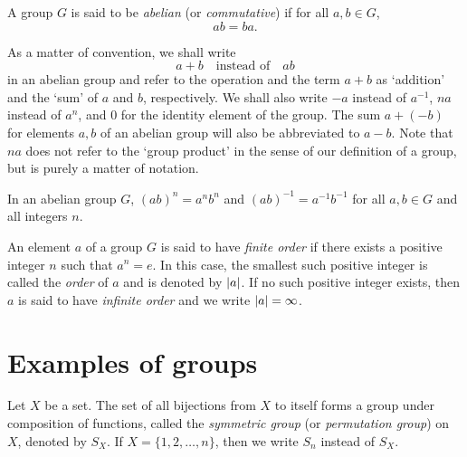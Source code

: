 \begin{definition}
    A group \(G\) is said to be \emph{abelian} (or \emph{commutative}) if for
    all \(a, b \in G\),
    \[
        ab = ba.
    \]
\end{definition}

\begin{remark}
    As a matter of convention, we shall write
    \[
        a + b \quad \text{instead of} \quad ab
    \]
    in an abelian group and refer to the operation and the term \(a + b\) as
    `addition' and the `sum' of \(a\) and \(b\), respectively. We shall also
    write \(-a\) instead of \(a^{-1}\), \(na\) instead of \(a^n\), and \(0\) for
    the identity element of the group. The sum \(a + (-b)\) for elements \(a,
    b\) of an abelian group will also be abbreviated to \(a - b\). Note that
    \(na\) does not refer to the `group product' in the sense of our definition
    of a group, but is purely a matter of notation.
\end{remark}

\begin{theorem}
    In an abelian group \(G\), \((ab)^n = a^n b^n\) and \((ab)^{-1} = a^{-1}
    b^{-1}\) for all \(a, b \in G\) and all integers \(n\).
\end{theorem}

\begin{definition}
    An element \(a\) of a group \(G\) is said to have \emph{finite order} if
    there exists a positive integer \(n\) such that \(a^n = e\). In this case,
    the smallest such positive integer is called the \emph{order} of \(a\) and
    is denoted by \(\lvert a \rvert\). If no such positive integer exists, then \(a\)
    is said to have \emph{infinite order} and we write \(\lvert a \rvert = \infty\).
\end{definition}



\section{Examples of groups}

\begin{definition}
    Let \(X\) be a set. The set of all bijections from \(X\) to itself forms a
    group under composition of functions, called the \emph{symmetric group} (or
    \emph{permutation group}) on \(X\), denoted by \(S_X\). If \(X = \{1, 2,
    \ldots, n\}\), then we write \(S_n\) instead of \(S_X\).
\end{definition}

